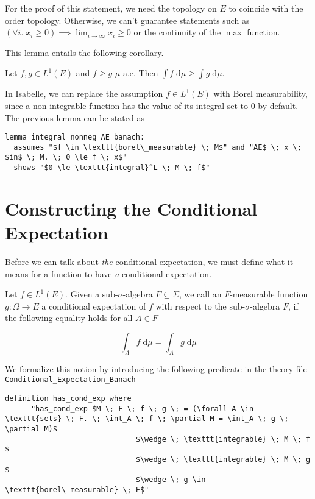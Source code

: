 \begin{remark}
For the proof of this statement, we need the topology on $E$ to coincide with the order topology. Otherwise, we can't guarantee statements such as $(\forall i. \; x_i \ge 0) \implies \lim_{i \to \infty} x_i \ge 0$ or the continuity of the $\max$ function.
\end{remark}
This lemma entails the following corollary.
\begin{corollary}
	Let $f, g \in L^1(E)$ and $f \ge g$ $\mu$-a.e. Then $\int f\;\textrm{d} \mu \ge \int g\;\textrm{d} \mu$.
\end{corollary}

In Isabelle, we can replace the assumption $f \in L^1(E)$ with Borel measurability, since a non-integrable function has the value of its integral set to $0$ by default. The previous lemma can be stated as
{\small
\begin{lstlisting}[style=isabelle]
lemma integral_nonneg_AE_banach:
  assumes "$f \in \texttt{borel\_measurable} \; M$" and "AE$ \; x \; $in$ \; M. \; 0 \le f \; x$"
  shows "$0 \le \texttt{integral}^L \; M \; f$"
\end{lstlisting}
}

\section{Constructing the Conditional Expectation}

Before we can talk about \textit{the} conditional expectation, we must define what it means for a function to have \textit{a} conditional expectation. 

\begin{definition}
	Let $f \in L^1(E)$. Given a sub-$\sigma$-algebra $F \subseteq \Sigma$, we call an $F$-measurable function $g : \Omega \rightarrow E$ a conditional expectation of $f$ with respect to the sub-$\sigma$-algebra $F$, if the following equality holds for all $A \in F$

	\[
		\int_A f \; \textrm{d} \mu = \int_A g \; \textrm{d} \mu
	\]

\end{definition}

We formalize this notion by introducing the following predicate in the theory file \texttt{Conditional\_Expectation\_Banach} 

\begin{isadefinition}
{\small
\begin{lstlisting}[style=isabelle]
	definition has_cond_exp where 
	  "has_cond_exp $M \; F \; f \; g \; = (\forall A \in \texttt{sets} \; F. \; \int_A \; f \; \partial M = \int_A \; g \; \partial M)$
							  $\wedge \; \texttt{integrable} \; M \; f $
							  $\wedge \; \texttt{integrable} \; M \; g $
							  $\wedge \; g \in \texttt{borel\_measurable} \; F$"
\end{lstlisting}
}
\end{isadefinition}

